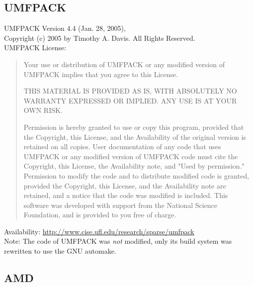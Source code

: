 \documentclass[10pt,a4paper]{ddedoc}
\begin{document}
\subsection{UMFPACK}

\noindent
UMFPACK Version 4.4 (Jan. 28, 2005), \\
Copyright (c) 2005 by Timothy A. Davis.  All Rights Reserved.\\[0.5em]
UMFPACK License:
\begin{quote}
    Your use or distribution of UMFPACK or any modified version of
    UMFPACK implies that you agree to this License.

    THIS MATERIAL IS PROVIDED AS IS, WITH ABSOLUTELY NO WARRANTY
    EXPRESSED OR IMPLIED.  ANY USE IS AT YOUR OWN RISK.

    Permission is hereby granted to use or copy this program, provided
    that the Copyright, this License, and the Availability of the original
    version is retained on all copies.  User documentation of any code that
    uses UMFPACK or any modified version of UMFPACK code must cite the
    Copyright, this License, the Availability note, and "Used by permission."
    Permission to modify the code and to distribute modified code is granted,
    provided the Copyright, this License, and the Availability note are
    retained, and a notice that the code was modified is included.  This
    software was developed with support from the National Science Foundation,
    and is provided to you free of charge.
\end{quote}
Availability: \url{http://www.cise.ufl.edu/research/sparse/umfpack} \\[0.5em]
Note: The code of UMFPACK was \emph{not} modified, only its build system was rewritten to use 
the GNU automake.

\subsection{AMD}
\end{document}
